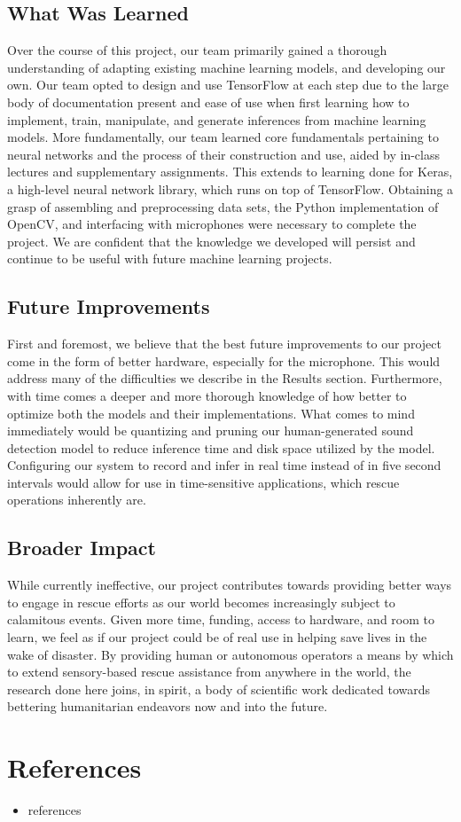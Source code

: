 \documentclass{article}
\begin{document}
\subsection{What Was Learned}
Over the course of this project, our team primarily gained a thorough understanding of adapting existing machine learning models, and developing our own. Our team opted to design and use TensorFlow at each step due to the large body of documentation present and ease of use when first learning how to implement, train, manipulate, and generate inferences from machine learning models. More fundamentally, our team learned core fundamentals pertaining to neural networks and the process of their construction and use, aided by in-class lectures and supplementary assignments. This extends to learning done for Keras, a high-level neural network library, which runs on top of TensorFlow.
Obtaining a grasp of assembling and preprocessing data sets, the Python implementation of OpenCV, and interfacing with microphones were necessary to complete the project. We are confident that the knowledge we developed will persist and continue to be useful with future machine learning projects.
\subsection{Future Improvements}
First and foremost, we believe that the best future improvements to our project come in the form of better hardware, especially for the microphone. This would address many of the difficulties we describe in the Results section. Furthermore, with time comes a deeper and more thorough knowledge of how better to optimize both the models and their implementations. What comes to mind immediately would be quantizing and pruning our human-generated sound detection model to reduce inference time and disk space utilized by the model. Configuring our system to record and infer in real time instead of in five second intervals would allow for use in time-sensitive applications, which rescue operations inherently are.
\subsection{Broader Impact}
While currently ineffective, our project contributes towards providing better ways to engage in rescue efforts as our world becomes increasingly subject to calamitous events. Given more time, funding, access to hardware, and room to learn, we feel as if our project could be of real use in helping save lives in the wake of disaster. By providing human or autonomous operators a means by which to extend sensory-based rescue assistance from anywhere in the world, the research done here joins, in spirit, a body of scientific work dedicated towards bettering humanitarian endeavors now and into the future.


\section{References}
\begin{itemize}
\item references
\end{itemize}
\end{document}
